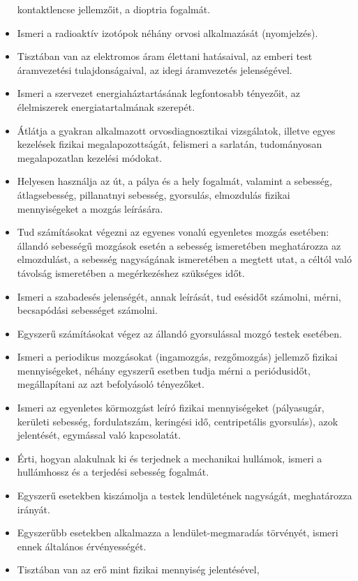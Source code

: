 \begin{itemize}
  kontaktlencse jellemzőit, a dioptria fogalmát.
\item
  Ismeri a radioaktív izotópok néhány orvosi alkalmazását (nyomjelzés).
\item
  Tisztában van az elektromos áram élettani hatásaival, az emberi test
  áramvezetési tulajdonságaival, az idegi áramvezetés jelenségével.
\item
  Ismeri a szervezet energiaháztartásának legfontosabb tényezőit, az
  élelmiszerek energiatartalmának szerepét.
\item
  Átlátja a gyakran alkalmazott orvosdiagnosztikai vizsgálatok, illetve
  egyes kezelések fizikai megalapozottságát, felismeri a sarlatán,
  tudományosan megalapozatlan kezelési módokat.
\item
  Helyesen használja az út, a pálya és a hely fogalmát, valamint a
  sebesség, átlagsebesség, pillanatnyi sebesség, gyorsulás, elmozdulás
  fizikai mennyiségeket a mozgás leírására.
\item
  Tud számításokat végezni az egyenes vonalú egyenletes mozgás esetében:
  állandó sebességű mozgások esetén a sebesség ismeretében meghatározza
  az elmozdulást, a sebesség nagyságának ismeretében a megtett utat, a
  céltól való távolság ismeretében a megérkezéshez szükséges időt.
\item
  Ismeri a szabadesés jelenségét, annak leírását, tud esésidőt számolni,
  mérni, becsapódási sebességet számolni.
\item
  Egyszerű számításokat végez az állandó gyorsulással mozgó testek
  esetében.
\item
  Ismeri a periodikus mozgásokat (ingamozgás, rezgőmozgás) jellemző
  fizikai mennyiségeket, néhány egyszerű esetben tudja mérni a
  periódusidőt, megállapítani az azt befolyásoló tényezőket.
\item
  Ismeri az egyenletes körmozgást leíró fizikai mennyiségeket
  (pályasugár, kerületi sebesség, fordulatszám, keringési idő,
  centripetális gyorsulás), azok jelentését, egymással való kapcsolatát.
\item
  Érti, hogyan alakulnak ki és terjednek a mechanikai hullámok, ismeri a
  hullámhossz és a terjedési sebesség fogalmát.
\item
  Egyszerű esetekben kiszámolja a testek lendületének nagyságát,
  meghatározza irányát.
\item
  Egyszerűbb esetekben alkalmazza a lendület-megmaradás törvényét,
  ismeri ennek általános érvényességét.
\item
  Tisztában van az erő mint fizikai mennyiség jelentésével,

\end{itemize}
